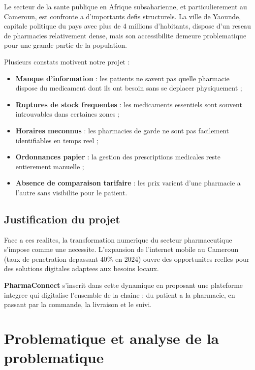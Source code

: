 \documentclass[12pt,a4paper]{report}
\begin{document}
Le secteur de la sante publique en Afrique subsaharienne, et particulierement au Cameroun, est confronte a d'importants defis structurels. La ville de Yaounde, capitale politique du pays avec plus de 4 millions d'habitants, dispose d'un reseau de pharmacies relativement dense, mais son accessibilite demeure problematique pour une grande partie de la population.

Plusieurs constats motivent notre projet :

\begin{itemize}[leftmargin=*,label=\textcolor{vertpharma}{\textbullet}]
    \item \textbf{Manque d'information} : les patients ne savent pas quelle pharmacie dispose du medicament dont ils ont besoin sans se deplacer physiquement ;
    \item \textbf{Ruptures de stock frequentes} : les medicaments essentiels sont souvent introuvables dans certaines zones ;
    \item \textbf{Horaires meconnus} : les pharmacies de garde ne sont pas facilement identifiables en temps reel ;
    \item \textbf{Ordonnances papier} : la gestion des prescriptions medicales reste entierement manuelle ;
    \item \textbf{Absence de comparaison tarifaire} : les prix varient d'une pharmacie a l'autre sans visibilite pour le patient.
\end{itemize}

\subsection{Justification du projet}

Face a ces realites, la transformation numerique du secteur pharmaceutique s'impose comme une necessite. L'expansion de l'internet mobile au Cameroun (taux de penetration depassant 40\% en 2024) ouvre des opportunites reelles pour des solutions digitales adaptees aux besoins locaux.

\textbf{PharmaConnect} s'inscrit dans cette dynamique en proposant une plateforme integree qui digitalise l'ensemble de la chaine : du patient a la pharmacie, en passant par la commande, la livraison et le suivi.

\section{Problematique et analyse de la problematique}
\end{document}
